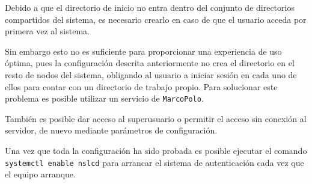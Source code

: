 \documentclass{article}
\begin{document}
Debido a que el directorio de inicio no entra dentro del conjunto de directorios compartidos del sistema, es necesario crearlo en caso de que el usuario acceda por primera vez al sistema. 


Sin embargo esto no es suficiente para proporcionar una experiencia de uso óptima, pues la configuración descrita anteriormente no crea el directorio en el resto de nodos del sistema, obligando al usuario a iniciar sesión en cada uno de ellos para contar con un directorio de trabajo propio. Para solucionar este problema es posible utilizar un servicio de \texttt{MarcoPolo}.

También es posible dar acceso al superusuario o permitir el acceso sin conexión al servidor, de nuevo mediante parámetros de configuración.

Una vez que toda la configuración ha sido probada es posible ejecutar el comando \texttt{systemctl enable nslcd} para arrancar el sistema de autenticación cada vez que el equipo arranque.

\nocite{ldapauthenticationarch}
\nocite{openldaparch}
\nocite{openldap}


\label{Bibliography}
\end{document}
